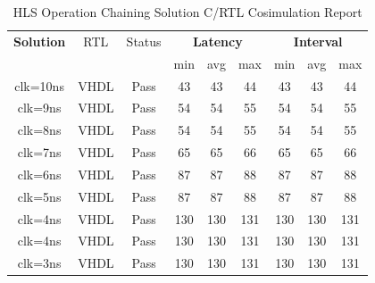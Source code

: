 \begin{table}[H]
    \centering
    \begin{tabular}{|c|c|c|c|c|c|c|c|c|}
        \hline
        \multicolumn{1}{|c|}{\textbf{Solution}} & \multicolumn{1}{|c|}{RTL} & \multicolumn{1}{|c|}{Status} & \multicolumn{3}{c|}{\textbf{Latency}} & \multicolumn{3}{c|}{\textbf{Interval}} \\
        & &  & min & avg & max & min & avg & max \\
        \hline
        clk=10ns & VHDL & Pass & 43 & 43 & 44 & 43 & 43 & 44 \\
        \hline
        clk=9ns & VHDL & Pass & 54 & 54 & 55 & 54 & 54 & 55 \\
        \hline
        clk=8ns & VHDL & Pass & 54 & 54 & 55 & 54 & 54 & 55 \\
        \hline
        clk=7ns & VHDL & Pass & 65 & 65 & 66 & 65 & 65 & 66 \\
        \hline
        clk=6ns & VHDL & Pass & 87 & 87 & 88 & 87 & 87 & 88 \\
        \hline
        clk=5ns & VHDL & Pass & 87 & 87 & 88 & 87 & 87 & 88 \\
        \hline
        clk=4ns & VHDL & Pass & 130 & 130 & 131 & 130 & 130 & 131 \\
        \hline
        clk=4ns & VHDL & Pass & 130 & 130 & 131 & 130 & 130 & 131 \\
        \hline
        clk=3ns & VHDL & Pass & 130 & 130 & 131 & 130 & 130 & 131 \\
        \hline
    \end{tabular}
    \caption{HLS Operation Chaining Solution C/RTL Cosimulation Report }
    \label{tab:hls-operation-chaining-solution-cosimulation-report}
\end{table}

